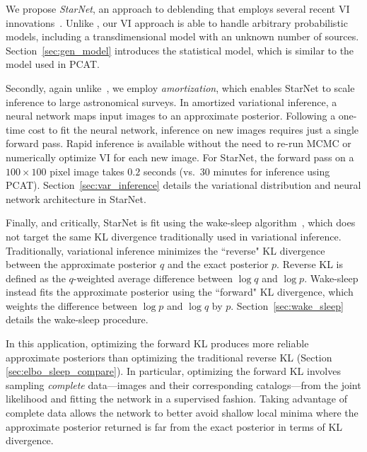 \nopagebreak[4]

We propose {\itshape StarNet}, an approach to deblending that employs several recent VI innovations~\citep{zhang2019advances,le2020revisiting}.
Unlike \cite{regier2019_celeste}, our VI approach is able to handle arbitrary probabilistic models, including a transdimensional model with an unknown number of sources. Section~\ref{sec:gen_model} introduces the statistical model, which is similar to the model used in PCAT.

Secondly, again unlike~\cite{regier2019_celeste}, 
we employ {\itshape amortization}, which enables StarNet to scale inference to large astronomical surveys. 
In amortized variational inference, a neural network maps input images to an approximate posterior.
Following a one-time cost to fit the neural network, inference 
on new images requires just a single forward pass.
Rapid inference is available without the need to re-run MCMC or numerically optimize VI for each new image. 
For StarNet, the forward pass on 
a $100 \times 100$ pixel image takes $0.2$ seconds (vs.~30 minutes for inference using PCAT).
Section~\ref{sec:var_inference} details the variational distribution and neural network architecture in StarNet. 

Finally, and critically, StarNet is fit using the wake-sleep algorithm~\citep{Hinton1995wake_sleep}, which does not target the same KL divergence traditionally used in  variational inference. Traditionally, variational inference minimizes the ``reverse" KL divergence between the approximate posterior $q$ and the exact posterior $p$.
Reverse KL is defined as the $q$-weighted average difference between $\log q$ and $\log p$. 
Wake-sleep instead fits the approximate posterior using the ``forward" KL divergence, which weights the difference between $\log p$ and $\log q$ by $p$.
Section~\ref{sec:wake_sleep} details the wake-sleep procedure. 


In this application, optimizing the forward KL produces more reliable approximate posteriors than optimizing the traditional reverse KL (Section \ref{sec:elbo_sleep_compare}). 
In particular, optimizing the forward KL involves sampling {\itshape complete} data---images and their corresponding catalogs---from the joint likelihood and fitting the network in a supervised fashion.
Taking advantage of complete data allows the network to better avoid shallow local minima where the approximate posterior returned is far from the exact posterior in terms of KL divergence. 

